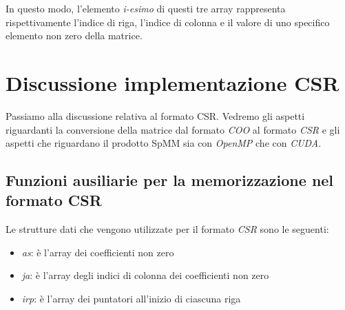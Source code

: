 \documentclass{article}
\begin{document}
In questo modo, l'elemento \textit{i-esimo} di questi tre array rappresenta rispettivamente l'indice di riga, l'indice di colonna e il valore di uno specifico elemento non zero della matrice.

\section{Discussione implementazione CSR}
Passiamo alla discussione relativa al formato CSR. Vedremo gli aspetti riguardanti la conversione della matrice dal formato \textit{COO} al formato \textit{CSR} e gli aspetti che riguardano il prodotto SpMM sia con \textit{OpenMP} che con \textit{CUDA}.

\subsection{Funzioni ausiliarie per la memorizzazione nel formato CSR}
Le strutture dati che vengono utilizzate per il formato \textit{CSR} sono le seguenti:

\begin{itemize}
\item \textit{as}: è l'array dei coefficienti non zero
\item \textit{ja}: è l'array degli indici di colonna dei coefficienti non zero
\item \textit{irp}: è l'array dei puntatori all'inizio di ciascuna riga
\end{itemize}
\end{document}
